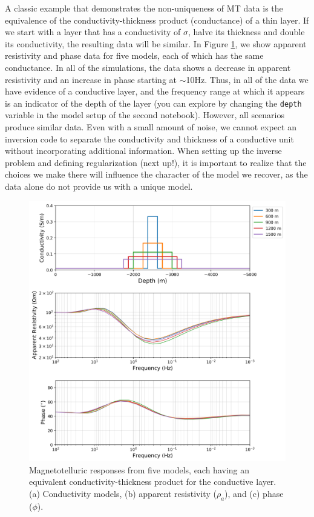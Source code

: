 \documentclass[11pt,oneside]{article}
\begin{document}
A classic example that demonstrates the non-uniqueness of MT data is the equivalence of the conductivity-thickness product (conductance) of a thin layer. If we start with a layer that has a conductivity of $\sigma$, halve its thickness and double its conductivity, the resulting data will be similar. In Figure \ref{fig:sigmat}, we show apparent resistivity and phase data for five models, each of which has the same conductance. In all of the simulations, the data shows a decrease in apparent resistivity and an increase in phase starting at $\sim$10Hz. Thus, in all of the data we have evidence of a conductive layer, and the frequency range at which it appears is an indicator of the depth of the layer (you can explore by changing the \texttt{depth} variable in the model setup of the second notebook). However, all scenarios produce similar data. Even with a small amount of noise, we cannot expect an inversion code to separate the conductivity and thickness of a conductive unit without incorporating additional information. When setting up the inverse problem and defining regularization (next up!), it is important to realize that the choices we make there will influence the character of the model we recover, as the data alone do not provide us with a unique model.

\begin{figure}[htb!]
    \centering
    \includegraphics[width=\textwidth]{images/sigmat.png}
\caption{Magnetotelluric responses from five models, each having an equivalent conductivity-thickness product for the conductive layer. (a) Conductivity models, (b) apparent resistivity ($\rho_a$), and (c) phase ($\phi$).}
\label{fig:sigmat}
\end{figure}
\end{document}
